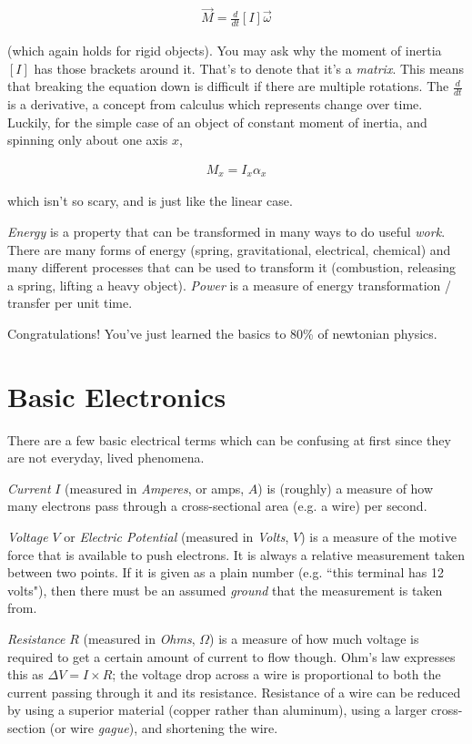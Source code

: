 \begin{align}
	\vec{M} = \frac{d}{dt} [I] \vec{\omega}
\end{align}

(which again holds for rigid objects). You may ask why the moment of inertia $[I]$ has those brackets around it. That's to denote that it's a \textit{matrix}. This means that breaking the equation down is difficult if there are multiple rotations. The $\frac{d}{dt}$ is a derivative, a concept from calculus which represents change over time. Luckily, for the simple case of an object of constant moment of inertia, and spinning only about one axis $x$,

\begin{align}
	M_x = I_x \alpha_x
\end{align}

which isn't so scary, and is just like the linear case.

\textit{Energy} is a property that can be transformed in many ways to do useful \textit{work}. There are many forms of energy (spring, gravitational, electrical, chemical) and many different processes that can be used to transform it (combustion, releasing a spring, lifting a heavy object).
\textit{Power} is a measure of energy transformation / transfer per unit time.

Congratulations! You've just learned the basics to 80\% of newtonian physics.

\section{Basic Electronics}
There are a few basic electrical terms which can be confusing at first since they are not everyday, lived phenomena.

\begin{asparaenum}[a)]
	\item \textit{Current} $I$ (measured in \textit{Amperes}, or amps, $A$) is (roughly) a measure of how many electrons pass through a cross-sectional area (e.g. a wire) per second.
	\item \textit{Voltage} $V$ or \textit{Electric Potential} (measured in \textit{Volts}, $V$) is a measure of the motive force that is available to push electrons. It is always a relative measurement taken between two points. If it is given as a plain number (e.g. ``this terminal has 12 volts"), then there must be an assumed \textit{ground} that the measurement is taken from.
	\item \textit{Resistance} $R$ (measured in \textit{Ohms}, $\Omega$) is a measure of how much voltage is required to get a certain amount of current to flow though. Ohm's law expresses this as $\Delta V = I \times R$; the voltage drop across a wire is proportional to both the current passing through it and its resistance. Resistance of a wire can be reduced by using a superior material (copper rather than aluminum), using a larger cross-section (or wire \textit{gague}), and shortening the wire.
\end{asparaenum}

